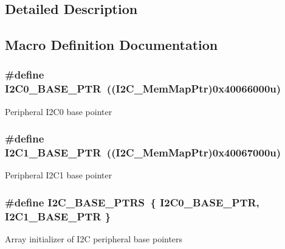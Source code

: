 \subsection{Detailed Description}


\subsection{Macro Definition Documentation}
\hypertarget{group___i2_c___peripheral_ga6db92fda81fa3b6a1c8c6a85e66d51a0}{}
\subsubsection[{I2\+C0\+\_\+\+B\+A\+S\+E\+\_\+\+P\+T\+R}]{\setlength{\rightskip}{0pt plus 5cm}\#define I2\+C0\+\_\+\+B\+A\+S\+E\+\_\+\+P\+T\+R~(({\bf I2\+C\+\_\+\+Mem\+Map\+Ptr})0x40066000u)}\label{group___i2_c___peripheral_ga6db92fda81fa3b6a1c8c6a85e66d51a0}
Peripheral I2\+C0 base pointer \hypertarget{group___i2_c___peripheral_gae13da5d584f2a4e2379db927a3f18772}{}
\subsubsection[{I2\+C1\+\_\+\+B\+A\+S\+E\+\_\+\+P\+T\+R}]{\setlength{\rightskip}{0pt plus 5cm}\#define I2\+C1\+\_\+\+B\+A\+S\+E\+\_\+\+P\+T\+R~(({\bf I2\+C\+\_\+\+Mem\+Map\+Ptr})0x40067000u)}\label{group___i2_c___peripheral_gae13da5d584f2a4e2379db927a3f18772}
Peripheral I2\+C1 base pointer \hypertarget{group___i2_c___peripheral_gaee17f364d6d1712b62774e6c33dea554}{}
\subsubsection[{I2\+C\+\_\+\+B\+A\+S\+E\+\_\+\+P\+T\+R\+S}]{\setlength{\rightskip}{0pt plus 5cm}\#define I2\+C\+\_\+\+B\+A\+S\+E\+\_\+\+P\+T\+R\+S~\{ {\bf I2\+C0\+\_\+\+B\+A\+S\+E\+\_\+\+P\+T\+R}, {\bf I2\+C1\+\_\+\+B\+A\+S\+E\+\_\+\+P\+T\+R} \}}\label{group___i2_c___peripheral_gaee17f364d6d1712b62774e6c33dea554}
Array initializer of I2\+C peripheral base pointers 

